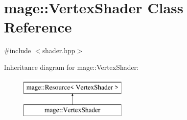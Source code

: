 \hypertarget{classmage_1_1_vertex_shader}{}\section{mage\+:\+:Vertex\+Shader Class Reference}
\label{classmage_1_1_vertex_shader}


{\ttfamily \#include $<$shader.\+hpp$>$}

Inheritance diagram for mage\+:\+:Vertex\+Shader\+:\begin{figure}[H]
\begin{center}
\leavevmode
\includegraphics[height=2.000000cm]{classmage_1_1_vertex_shader}
\end{center}
\end{figure}
